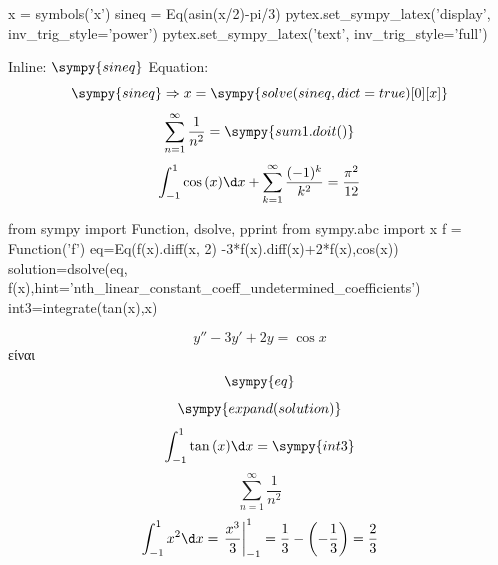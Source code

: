 \documentclass[twoside,nofonts,internet,math,spyros]{frontisthrio}
\begin{document}
\begin{sympycode}
x = symbols('x')
sineq = Eq(asin(x/2)-pi/3)
pytex.set_sympy_latex('display',
inv_trig_style='power')
pytex.set_sympy_latex('text',
inv_trig_style='full')
\end{sympycode}
Inline: $\sympy{sineq}$
Equation: \[ \sympy{sineq}\Rightarrow x=\sympy{solve(sineq,dict=true)[0][x]} \]
\[ \sum_{n=1}^{\infty}\frac{1}{n^2}=\sympy{sum1.doit()} \]
\[ \int_{-1}^{1}{\cos{(x)}\d x}+\sum_{k=1}^{\infty}{\frac{(-1)^k}{k^2}}=\frac{\pi^2}{12} \]
\begin{sympycode}
from sympy import Function, dsolve, pprint
from sympy.abc import x
f = Function('f')
eq=Eq(f(x).diff(x, 2) -3*f(x).diff(x)+2*f(x),cos(x))
solution=dsolve(eq, f(x),hint='nth_linear_constant_coeff_undetermined_coefficients')
int3=integrate(tan(x),x)
\end{sympycode}
\[ y''-3y'+2y=\cos{x} \]
είναι
\[ \sympy{eq} \]
\[ \sympy{expand(solution)} \]
\[ \int_{-1}^{1}{\tan{(x)}\d x}=\sympy{int3} \]
\[ \sum_{n=1}^{\infty}{\frac{1}{n^2}} \]
\[ \int_{-1}^{1}{x^2\d x}=\left.\frac{x^3}{3}\right|_{-1}^{1}=\frac{1}{3}-\left(-\frac{1}{3}\right)=\frac{2}{3} \]
\end{document}
